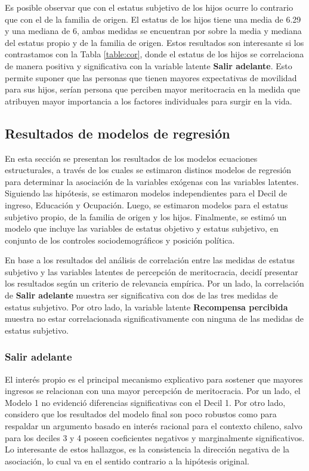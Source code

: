 \documentclass[12pt]{article}
\begin{document}
Es posible observar que con el estatus subjetivo de los hijos ocurre lo contrario que con el de la familia de origen. El estatus de los hijos tiene una media de 6.29 y una mediana de 6, ambas medidas se encuentran por sobre la media y mediana del estatus propio y de la familia de origen. Estos resultados son interesante si los contrastamos con la Tabla \ref{table:cor}, donde el estatus de los hijos se correlaciona de manera positiva y significativa con la variable latente \textbf{Salir adelante}. Esto permite suponer que las personas que tienen mayores expectativas de movilidad para sus hijos, serían persona que perciben mayor meritocracia en la medida que atribuyen mayor importancia a los factores individuales para surgir en la vida. 

\newpage      	

\subsection{Resultados de modelos de regresión}

En esta sección se presentan los resultados de los modelos ecuaciones estructurales, a través de los cuales se estimaron distinos modelos de regresión para determinar la asociación de la variables exógenas con las variables latentes. Siguiendo las hipótesis, se estimaron modelos independientes para el Decil de ingreso, Educación y Ocupación. Luego, se estimaron modelos para el estatus subjetivo propio, de la familia de origen y los hijos. Finalmente, se estimó un modelo que incluye las variables de estatus objetivo y estatus subjetivo, en conjunto de los controles sociodemográficos y posición política. 
	
En base a los resultados del análisis de correlación entre las medidas de estatus subjetivo y las variables latentes de percepción de meritocracia, decidí presentar los resultados según un criterio de relevancia empírica. Por un lado, la correlación de \textbf{Salir adelante} muestra ser significativa con dos de las tres medidas de estatus subjetivo. Por otro lado, la variable latente \textbf{Recompensa percibida} muestra no estar correlacionada significativamente con ninguna de las medidas de estatus subjetivo. 

\subsubsection[Variable latente \textit{Salir adelante}]{Salir adelante}

El interés propio es el principal mecanismo explicativo para sostener que mayores ingresos se relacionan con una mayor percepción de meritocracia. Por un lado, el Modelo 1 no evidenció diferencias significativas con el Decil 1. Por otro lado, considero que los resultados del modelo final son poco robustos como para respaldar un argumento basado en interés racional para el contexto chileno, salvo para los deciles 3 y 4 poseen coeficientes negativos y marginalmente significativos. Lo interesante de estos hallazgos, es la consistencia la dirección negativa de la asociación, lo cual va en el sentido contrario a la hipótesis original. 
\end{document}
